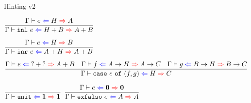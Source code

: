 \documentclass{beamer}
\newcommand{\Fun}[2]{#1 \to #2}
\newcommand{\Sum}[2]{#1 + #2}
\newcommand{\Unit}{\textbf{1}}
\newcommand{\Empty}{\textbf{0}}
\newcommand{\inl}[1][]{\texttt{inl}\ #1}
\newcommand{\inr}[1][]{\texttt{inr}\ #1}
\newcommand{\case}[3]{\texttt{case}\ #1\ \texttt{of}\ (#2, #3)}
\newcommand{\unit}{\texttt{unit}}
\newcommand{\exfalso}[1][]{\texttt{exfalso}\ #1}
\newcommand{\infrule}[3][]{\displaystyle \frac{#2}{#3} \textsc{\footnotesize{#1}}}
\begin{document}
\begin{frame}{Hinting v2}

\begin{center}
  $\infrule{\hinting{e}{H}{A}}{\hinting{\inl[e]}{\Sum{H}{B}}{\Sum{A}{B}}}$

  \vspace{2em}

  $\infrule{\hinting{e}{H}{B}}{\hinting{\inr[e]}{\Sum{A}{H}}{\Sum{A}{B}}}$

  \vspace{2em}

  $\infrule{\hinting{e}{\Sum{\Hint}{\Hint}}{\Sum{A}{B}} \quad \hinting{f}{\Fun{A}{H}}{\Fun{A}{C}} \quad \hinting{g}{\Fun{B}{H}}{\Fun{B}{C}}}{\hinting{\case{e}{f}{g}}{H}{C}}$

  \vspace{2em}

  $\infrule{}{\hinting{\unit}{\Unit}{\Unit}}$ \quad
  $\infrule{\hinting{e}{\Empty}{\Empty}}{\hinting{\exfalso[e]}{A}{A}}$
\end{center}

\end{frame}
\end{document}
